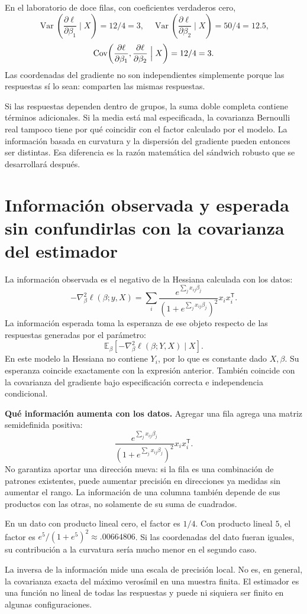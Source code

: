 \documentclass[11pt,a4paper]{article}
\newcommand{\E}{\mathbb E}
\newcommand{\T}{^{\mathsf T}}
\DeclareMathOperator{\Var}{Var}
\DeclareMathOperator{\Cov}{Cov}
\begin{document}
\begin{ejemplo}
En el laboratorio de doce filas, con coeficientes verdaderos cero,
\[
\Var\!\left(\frac{\partial\ell}{\partial\beta_1}\mid X\right)=12/4=3,
\quad
\Var\!\left(\frac{\partial\ell}{\partial\beta_2}\mid X\right)=50/4=12.5,
\]
\[
\Cov\!\left(
\frac{\partial\ell}{\partial\beta_1},
\frac{\partial\ell}{\partial\beta_2}\Bigm|X\right)=12/4=3.
\]
Las coordenadas del gradiente no son independientes simplemente
porque las respuestas sí lo sean: comparten las mismas respuestas.
\end{ejemplo}
Si las respuestas dependen dentro de grupos, la suma doble completa
contiene términos adicionales.
Si la media está mal especificada, la covarianza Bernoulli real tampoco
tiene por qué coincidir con el factor calculado por el modelo.
La información basada en curvatura y la dispersión del gradiente
pueden entonces ser distintas.
Esa diferencia es la razón matemática del sándwich robusto que se
desarrollará después.

\clearpage
\section{Información observada y esperada sin confundirlas con la covarianza del estimador}\label{logit34}
La información observada es el negativo de la Hessiana calculada
con los datos:
\[
-\nabla_\beta^2\ell(\beta;y,X)
=\sum_i
\frac{e^{\sum_jx_{ij}\beta_j}}
{(1+e^{\sum_jx_{ij}\beta_j})^2}x_ix_i\T.
\]
La información esperada toma la esperanza de ese objeto respecto de
las respuestas generadas por el parámetro:
\[
\E_\beta[-\nabla_\beta^2\ell(\beta;Y,X)\mid X].
\]
En este modelo la Hessiana no contiene $Y_i$, por lo que es constante
dado $X,\beta$. Su esperanza coincide exactamente con la expresión
anterior. También coincide con la covarianza del gradiente
bajo especificación correcta e independencia condicional.

\textbf{Qué información aumenta con los datos.}
Agregar una fila agrega una matriz semidefinida positiva:
\[
\frac{e^{\sum_jx_{ij}\beta_j}}
{(1+e^{\sum_jx_{ij}\beta_j})^2}x_ix_i\T.
\]
No garantiza aportar una dirección nueva: si la fila es una
combinación de patrones existentes, puede aumentar precisión en
direcciones ya medidas sin aumentar el rango.
La información de una columna también depende de sus productos con
las otras, no solamente de su suma de cuadrados.

\begin{ejemplo}
En un dato con producto lineal cero, el factor es $1/4$.
Con producto lineal $5$, el factor es
$e^5/(1+e^5)^2\approx.00664806$.
Si las coordenadas del dato fueran iguales, su contribución a
la curvatura sería mucho menor en el segundo caso.
\end{ejemplo}
La inversa de la información mide una escala de precisión local.
No es, en general, la covarianza exacta del máximo verosímil en
una muestra finita. El estimador es una función no lineal de todas
las respuestas y puede ni siquiera ser finito en algunas configuraciones.
\end{document}
